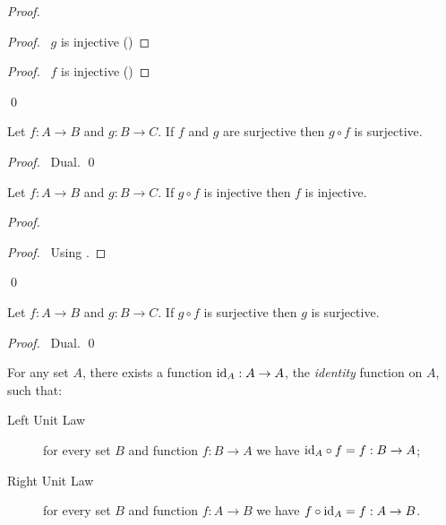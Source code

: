 \begin{proof}
 \pf
 \begin{proof}
   \pf\ $g$ is injective ()
 \end{proof}
 \begin{proof}
   \pf\ $f$ is injective ()
 \end{proof}
 \qed
\end{proof}

\begin{lm}
 Let $f : A \rightarrow B$ and $g : B \rightarrow C$. If $f$ and $g$ are
surjective then $g \circ f$ is surjective.
\end{lm}

\begin{proof}
 \pf\ Dual. \qed
\end{proof}

\begin{lm}
 Let $f : A \rightarrow B$ and $g : B \rightarrow C$. If $g \circ f$ is
injective then $f$ is injective.
\end{lm}

\begin{proof}
 \pf
 \begin{proof}
   \pf\ Using .
 \end{proof}
 \qed
\end{proof}

\begin{lm}
 Let $f : A \rightarrow B$ and $g : B \rightarrow C$. If $g \circ f$ is
surjective then $g$ is surjective.
\end{lm}

\begin{proof}
 \pf\ Dual. \qed
\end{proof}

\begin{ax}
  For any set $A$, there exists a function $\mathrm{id}_{A} : A \rightarrow A$, the
  \emph{identity} function on $A$, such that:
  \begin{description}
    \item[Left Unit Law] for every set $B$ and function $f : B \rightarrow A$
    we have $\mathrm{id}_{A}      \circ f = f : B \rightarrow A$;
    \item[Right Unit Law] for every set $B$ and function $f : A \rightarrow
    B$
    we have $f      \circ \mathrm{id}_{A} = f : A \rightarrow B$.
  \end{description}
\end{ax}

